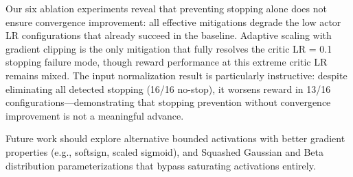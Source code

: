 Our six ablation experiments reveal that preventing stopping alone does not ensure convergence improvement: all effective mitigations degrade the low actor LR configurations that already succeed in the baseline. Adaptive scaling with gradient clipping is the only mitigation that fully resolves the critic LR = 0.1 stopping failure mode, though reward performance at this extreme critic LR remains mixed. The input normalization result is particularly instructive: despite eliminating all detected stopping (16/16 no-stop), it worsens reward in 13/16 configurations---demonstrating that stopping prevention without convergence improvement is not a meaningful advance.

Future work should explore alternative bounded activations with better gradient properties (e.g., softsign, scaled sigmoid), and Squashed Gaussian and Beta distribution parameterizations that bypass saturating activations entirely.
